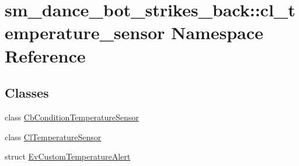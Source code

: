 \hypertarget{namespacesm__dance__bot__strikes__back_1_1cl__temperature__sensor}{}\section{sm\+\_\+dance\+\_\+bot\+\_\+strikes\+\_\+back\+:\+:cl\+\_\+temperature\+\_\+sensor Namespace Reference}
\label{namespacesm__dance__bot__strikes__back_1_1cl__temperature__sensor}
\subsection*{Classes}
\begin{DoxyCompactItemize}
\item 
class \hyperlink{classsm__dance__bot__strikes__back_1_1cl__temperature__sensor_1_1CbConditionTemperatureSensor}{Cb\+Condition\+Temperature\+Sensor}
\item 
class \hyperlink{classsm__dance__bot__strikes__back_1_1cl__temperature__sensor_1_1ClTemperatureSensor}{Cl\+Temperature\+Sensor}
\item 
struct \hyperlink{structsm__dance__bot__strikes__back_1_1cl__temperature__sensor_1_1EvCustomTemperatureAlert}{Ev\+Custom\+Temperature\+Alert}
\end{DoxyCompactItemize}
